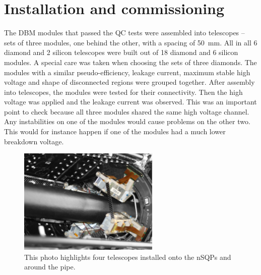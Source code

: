 \section{Installation and commissioning}
\label{sec:install}

The DBM modules that passed the QC tests were assembled into telescopes -- sets of three modules, one behind the other, with a spacing of 50~mm. All in all 6 diamond and 2 silicon telescopes were built out of 18 diamond and 6 silicon modules. A special care was taken when choosing the sets of three diamonds. The modules with a similar pseudo-efficiency, leakage current, maximum stable high voltage and shape of disconnected regions were grouped together. After assembly into telescopes, the modules were tested for their connectivity. Then the high voltage was applied and the leakage current was observed. This was an important point to check because all three modules shared the same high voltage channel. Any instabilities on one of the modules would cause problems on the other two. This would for instance happen if one of the modules had a much lower breakdown voltage.
\begin{figure}[!t]
\centering
\includegraphics[width=0.6\textwidth]{04_charge_monitoring/pics/DBM-installed-colour1}
\caption{This photo highlights four telescopes installed onto the nSQPs and around the pipe.}
\label{fig:dbminatlas1}
\end{figure}

